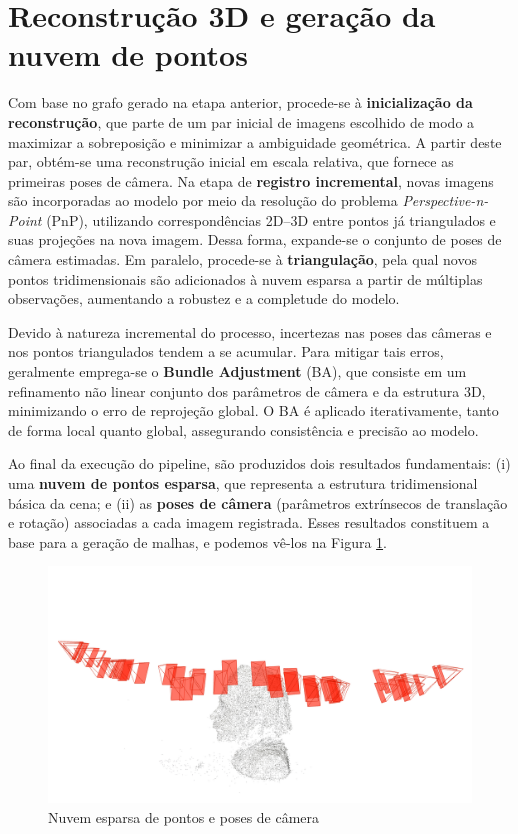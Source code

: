 \documentclass[12pt]{article}
\begin{document}
\section{Reconstrução 3D e geração da nuvem de pontos}

Com base no grafo gerado na etapa anterior, procede-se à \textbf{inicialização da reconstrução}, que parte de um par inicial de imagens escolhido de modo a maximizar a sobreposição e minimizar a ambiguidade geométrica. A partir deste par, obtém-se uma reconstrução inicial em escala relativa, que fornece as primeiras poses de câmera. Na etapa de \textbf{registro incremental}, novas imagens são incorporadas ao modelo por meio da resolução do problema \textit{Perspective-n-Point} (PnP), utilizando correspondências 2D–3D entre pontos já triangulados e suas projeções na nova imagem. Dessa forma, expande-se o conjunto de poses de câmera estimadas. Em paralelo, procede-se à \textbf{triangulação}, pela qual novos pontos tridimensionais são adicionados à nuvem esparsa a partir de múltiplas observações, aumentando a robustez e a completude do modelo.

Devido à natureza incremental do processo, incertezas nas poses das câmeras e nos pontos triangulados tendem a se acumular. Para mitigar tais erros, geralmente emprega-se o \textbf{Bundle Adjustment} (BA), que consiste em um refinamento não linear conjunto dos parâmetros de câmera e da estrutura 3D, minimizando o erro de reprojeção global. O BA é aplicado iterativamente, tanto de forma local quanto global, assegurando consistência e precisão ao modelo. 

Ao final da execução do pipeline, são produzidos dois resultados fundamentais: (i) uma \textbf{nuvem de pontos esparsa}, que representa a estrutura tridimensional básica da cena; e (ii) as \textbf{poses de câmera} (parâmetros extrínsecos de translação e rotação) associadas a cada imagem registrada. Esses resultados constituem a base para a geração de malhas, e podemos vê-los na Figura \ref{fig:sparsePoint3}.

\begin{figure}[H]
    \centering
    \includegraphics[width=.5\textwidth]{images/view_sparsePoint3.png}
    \caption{Nuvem esparsa de pontos e poses de câmera}
    \label{fig:sparsePoint3}
\end{figure}
\end{document}
